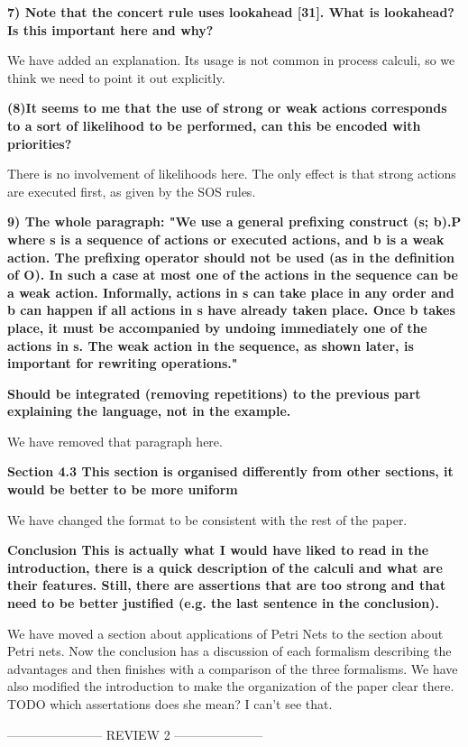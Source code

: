 \documentclass{article}
\begin{document}
\textbf{7) Note that the concert rule uses lookahead [31].
What is lookahead? Is this important here and why?}

We have added an explanation. Its usage is not common in process calculi, so we think we need to point it out explicitly.

\textbf{(8)It seems to me that the use of strong or weak actions corresponds to a sort of likelihood to be performed, can this be encoded with priorities?}

There is no involvement of likelihoods here. The only effect is that strong actions are executed first, as given by the SOS rules.

\textbf{9) The whole paragraph:
"We use a general prefixing construct (s; b).P where s is a sequence of actions or executed actions, and b is a weak action. The prefixing operator should not be used (as in the definition of O). In such a case at most one of the actions in the sequence can be a weak action. Informally, actions in s can take place in any order and b can happen if all actions in s have already taken place. Once b takes place, it must be accompanied by undoing immediately one of the actions in s. The weak action in the sequence, as shown later, is important for rewriting operations."}

\textbf{Should be integrated (removing repetitions) to the previous part explaining the language, not in the example.}

We have removed that paragraph here.

\textbf{Section 4.3
This section is organised differently from other sections, it would be better to be more uniform}

We have changed the format to be consistent with the rest of the paper. 

\textbf{Conclusion
This is actually what I would have liked to read in the introduction, there is a quick description of the calculi and what are their features.
Still, there are assertions that are too strong and that need to be better justified (e.g. the last sentence in the conclusion).}

We have moved a section about applications of Petri Nets to the section about Petri nets. Now the conclusion has a discussion of each formalism describing the advantages and then finishes with a comparison of the three formalisms. We have also modified the introduction to make the organization of the paper clear there.
TODO which assertations does she mean? I can't see that.

----------------------- REVIEW 2 ---------------------
\end{document}
